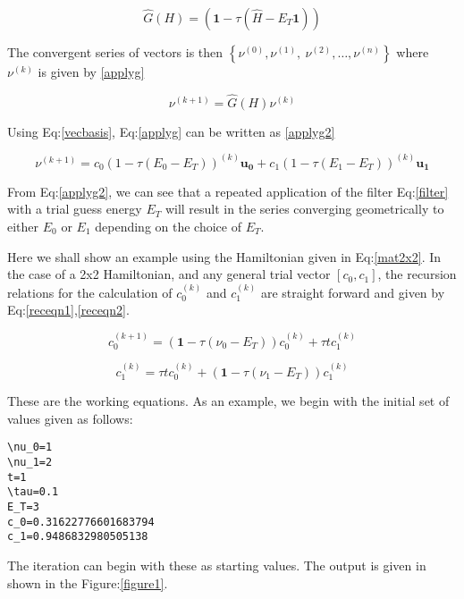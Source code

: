 \documentclass[11pt]{article}
\begin{document}
\begin{equation}
\label{filter}
\hat{G}(H) = \left ( \mathbf{1} - \tau (\hat{H} - E_T\mathbf{1}) \right)
\end{equation}

The convergent series of vectors is then \(\left\{ \nu^{(0)},  \nu^{(1)},\
\nu^{(2)},\dots,\nu^{(n)}\right\}\) where \(\nu^{(k)}\) is given by \ref{applyg}

\begin{equation}
\label{applyg}
\nu^{(k+1)} = \hat{G}(H)\nu^{(k)}
\end{equation}

Using Eq:\ref{vecbasis}, Eq:\ref{applyg} can be written as \ref{applyg2}

\begin{equation}
\label{applyg2}
\nu^{(k+1)} = c_0 (1-\tau(E_0-E_T))^{(k)}\mathbf{u_0} + c_1 (1-\tau(E_1-E_T))^{(k)}\mathbf{u_1}
\end{equation}

From Eq:\ref{applyg2}, we can see that a repeated application of the filter Eq:\ref{filter}
with a trial guess energy \(E_T\) will result in the series converging
geometrically to either \(E_0\) or \(E_1\) depending on the choice of \(E_T\).

Here we shall show an example using the Hamiltonian given in Eq:\ref{mat2x2}. In the
case of a 2x2 Hamiltonian, and any general trial vector \([c_0,c_1]\), the
recursion relations for the calculation of \(c^{(k)}_0\) and \(c^{(k)}_1\) are
straight forward and given by Eq:\ref{receqn1},\ref{receqn2}.

\begin{equation}
\label{receqn1}
c^{(k+1)}_0 =  \left(\mathbf{1}-\tau\left(\nu_0 - E_T\right)\right)c^{(k)}_0 + \tau t c^{(k)}_1
\end{equation}

\begin{equation}
\label{receqn2}
c^{(k)}_1 = \tau t c^{(k)}_0 + \left(\mathbf{1}-\tau\left(\nu_1 - E_T\right)\right)c^{(k)}_1
\end{equation}

These are the working equations. As an example, we begin with the initial set of
values given as follows:

\begin{verbatim}
\nu_0=1
\nu_1=2
t=1
\tau=0.1
E_T=3
c_0=0.31622776601683794
c_1=0.9486832980505138
\end{verbatim}

The iteration can begin with these as starting values. The output is given in
shown in the Figure:\ref{figure1}.
\end{document}
